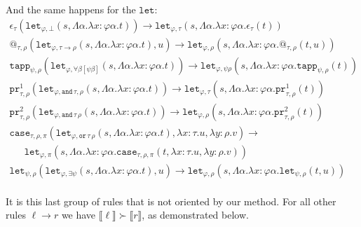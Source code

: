 \documentclass[a4paper,UKenglish,cleveref,autoref,numberwithinsect]{lipics-v2019}
\theoremstyle{definition}
\newcommand{\arrtype}{\rightarrow}
\newcommand{\abs}[2]{\lambda #1.#2}
\newcommand{\tabs}[2]{\Lambda #1.#2}
\newcommand{\red}{\longrightarrow}
\newcommand{\interpret}[1]{\llbracket #1 \rrbracket}
\newcommand{\proj}{\mathtt{pr}}
\begin{document}
And the same happens for the $\mathtt{let}$:
\[
\begin{array}{l}
\epsilon_\tau(\mathtt{let}_{\varphi,\bot}(s,\tabs{\alpha}{
  \abs{x:\varphi\alpha}{t}})) \red
  \mathtt{let}_{\varphi,\tau}(s,\tabs{\alpha}{\abs{x:\varphi\alpha}{
  \epsilon_\tau(t)}}) \\
@_{\tau,\rho}(\mathtt{let}_{\varphi, \tau \arrtype
  \rho}(s,\tabs{\alpha}{\abs{x:\varphi\alpha}{t}}),u) \red
  \mathtt{let}_{\varphi,\rho}(s,\tabs{\alpha}{\abs{x:\varphi\alpha}{
  @_{\tau,\rho}(t,u)}}) \\
\mathtt{tapp}_{\psi,\rho}(\mathtt{let}_{\varphi,
  \forall\beta[\psi\beta]}(s,\tabs{\alpha}{\abs{x:\varphi\alpha}{t}}))
  \red 
  \mathtt{let}_{\varphi,\psi\rho}(s,\tabs{\alpha}{\abs{x:\varphi\alpha}{
  \mathtt{tapp}_{\psi,\rho}(t)}}) \\
\proj^1_{\tau,\rho}(\mathtt{let}_{\varphi,
  \mathtt{and}\,\tau,\rho}(s,\tabs{\alpha}{\abs{x:\varphi\alpha}{t}}))
  \red
  \mathtt{let}_{\varphi,\tau}(s,\tabs{\alpha}{\abs{x:\varphi\alpha}{
  \proj^1_{\tau,\rho}(t)}}) \\
\proj^2_{\tau,\rho}(\mathtt{let}_{\varphi,
  \mathtt{and}\,\tau\,\rho}(s,\tabs{\alpha}{\abs{x:\varphi\alpha}{t}}))
  \red
  \mathtt{let}_{\varphi,\rho}(s,\tabs{\alpha}{\abs{x:\varphi\alpha}{
  \proj^2_{\tau,\rho}(t)}}) \\
\mathtt{case}_{\tau,\rho,\pi}(
  \mathtt{let}_{\varphi,\mathtt{or}\,\tau\,\rho}(s,\tabs{\alpha}{
  \abs{x:\varphi\alpha}{t}}),\abs{x:\tau}{u},\abs{y:\rho}{v})
  \red \\
\phantom{AB}
  \mathtt{let}_{\varphi,\pi}(s,\tabs{\alpha}{\abs{x:\varphi\alpha}{
  \mathtt{case}_{\tau,\rho,\pi}(t,\abs{x:\tau}{u},\abs{y:\rho}{v})}}) \\
\mathtt{let}_{\psi,\rho}(\mathtt{let}_{\varphi,\exists\psi}(s,
  \tabs{\alpha}{\abs{x:\varphi\alpha}{t}}),u) \red
  \mathtt{let}_{\varphi,\rho}(s,\tabs{\alpha}{\abs{x:\varphi\alpha}{
  \mathtt{let}_{\psi,\rho}(t,u)}}) \\
\end{array}
\]

It is this last group of rules that is not oriented by our method.
For all other rules $\ell \red r$ we have $\interpret{\ell} \succ
\interpret{r}$, as demonstrated below.
\end{document}
